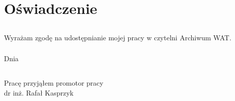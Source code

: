 \chapter*{Oświadczenie}

\section*{}
Wyrażam zgodę na udostępnianie mojej pracy w czytelni Archiwum  WAT.

\subsection*{}
Dnia \dotfill

\section*{}
\begin{flushright}
	Pracę przyjąłem
	\linebreak
	\linebreak
	\linebreak
	\linebreak
	promotor  pracy\\
	dr inż. Rafał Kasprzyk
\end{flushright}
